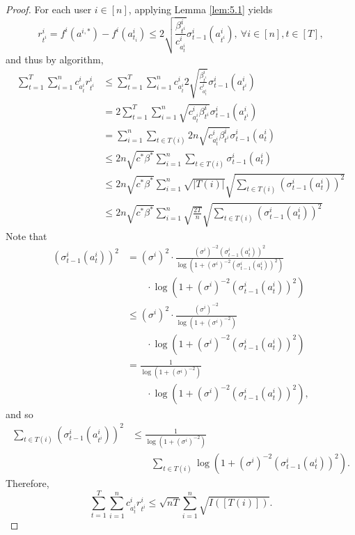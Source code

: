 \documentclass[letterpaper]{vldb}
\begin{document}
\begin{proof}
  For each user $i\in [n]$, applying Lemma \ref{lem:5.1} yields
  \[
    r^i_{t^i} = f^i(a^{i,\ast}) - f^i(a^i_{t_i})\le 2
    \sqrt{\frac{\beta^i_{t^i}}{c^i_{a^i_{t}}}}\sigma^i_{t-1}(a^i_{t^i}),\ \forall
    i\in [n], t\in [T],
  \]
   and thus by algorithm,
  \begin{align*}
    \sum_{t=1}^T \sum_{i=1}^n c^i_{a^i_t} r^i_{t^i}
    & \le \sum_{t=1}                                                    ^T \sum_{i=1}^n c^i_{a_t^i} 2 \sqrt{\frac{\beta^i_{t^i}}{c^i_{a^i_{t}}}}\sigma^i_{t-1}(a^i_{t^i})\\
        & = 2  \sum_{t=1}^T \sum_{i=1}^n \sqrt{c^i_{a^i_{t}}\beta^i_{t^i}}\sigma^i_{t-1}(a^i_{t^i})\\
    & = \sum_{i=1}^n\sum_{t\in T(i)} 2n\sqrt{c^i_{a^i_{t}}\beta^i_{t^i}}\sigma^i_{t-1}(a^i_{t})\\
    & \le 2n \sqrt{c^\ast\beta^\ast}\sum_{i=1}^n\sum_{t\in T(i)}\sigma^i_{t-1}(a^i_{t})\\
    & \le 2n \sqrt{c^\ast\beta^\ast}\sum_{i=1}^n\sqrt{|T(i)|}\sqrt{\sum_{t\in T(i)} (\sigma^i_{t-1}(a^i_{t}))^2}\\
    & \le 2n \sqrt{c^\ast\beta^\ast}\sum_{i=1}^n\sqrt{\frac{2T}{n}}\sqrt{\sum_{t\in T(i)} (\sigma^i_{t-1}(a^i_{t}))^2}
  \end{align*}
  Note that
\begin{align*}
    (\sigma^i_{t-1}(a^i_{t}))^2
    & = (\sigma^i)^2\cdot \frac{(\sigma^i)^{-2} (\sigma^i_{t-1}(a^i_{t}))^2}{\log\left(1 + (\sigma^i)^{-2} (\sigma^i_{t-1}(a^i_{t}))^2\right)}\\
    &\qquad \cdot \log\left(1 + (\sigma^i)^{-2} (\sigma^i_{t-1}(a^i_{t}))^2\right)\\
    & \le (\sigma^i)^2 \cdot \frac{(\sigma^i)^{-2}}{\log\left(1 + (\sigma^i)^{-2}\right)}\\
    &\qquad \cdot \log\left(1 + (\sigma^i)^{-2} (\sigma^i_{t-1}(a^i_{t}))^2\right)\\
    & = \frac{1}{\log\left(1 + (\sigma^i)^{-2}\right)}\\   
    &\qquad \cdot \log\left(1 + (\sigma^i)^{-2} (\sigma^i_{t-1}(a^i_{t}))^2\right),
  \end{align*}
  and so
  \begin{align*}
      \sum_{t\in T(i)} (\sigma^i_{t-1}(a^i_{t^i}))^2
      & \le \frac{1}{\log\left(1 + (\sigma^i)^{-2}\right)}\\
    &\qquad \sum_{t\in T(i)} \log\left(1 + (\sigma^i)^{-2} (\sigma^i_{t-1}(a^i_{t}))^2\right).
  \end{align*}
  Therefore,
  \[
    \sum_{t=1}^T \sum_{i=1}^n c^i_{a^i_t} r^i_{t^i} \le \sqrt{n T}\sum_{i=1}^n \sqrt{I([T(i)])}.
  \]
\end{proof}
\end{document}
